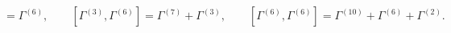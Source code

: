 \begin{equation}
[\Gamma^{(2)},\Gamma^{(6)}]=\Gamma^{(6)},\qquad
[\Gamma^{(3)},\Gamma^{(6)}]=\Gamma^{(7)}+\Gamma^{(3)},\qquad
[\Gamma^{(6)},\Gamma^{(6)}]=\Gamma^{(10)}+\Gamma^{(6)}+\Gamma^{(2)}.
\label{eq:gam6com}
\end{equation}

